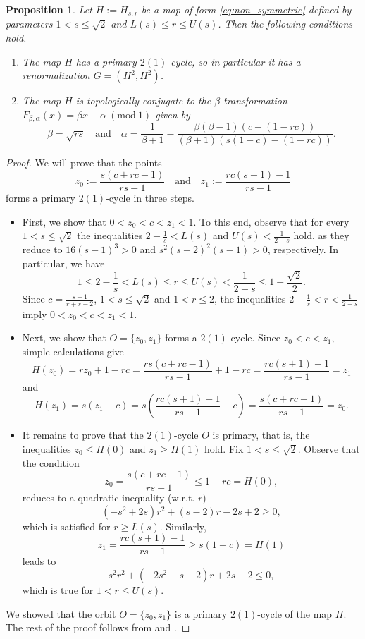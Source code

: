 \documentclass[10pt,reqno]{amsart}
\theoremstyle{plain}
\theoremstyle{assumption}
\theoremstyle{notation}
\theoremstyle{claim}
\theoremstyle{conj}
\theoremstyle{theorem}
\theoremstyle{proposition}
\newtheorem{proposition}{Proposition}[section]
\theoremstyle{corollary}
\newcommand{\Mod}[1]{\ (\mathrm{mod}\ #1)}
\begin{document}
\begin{proposition}
    \label{prop:non_symmetric}
    Let $H:=H_{s,r}$ be a map of form \eqref{eq:non_symmetric} defined by parameters
    $1<s\leq\sqrt{2}$ and $L(s)\leq r\leq U(s)$. Then the following conditions hold.
    \begin{enumerate}
        \item The map $H$ has a primary $2(1)$-cycle, so in particular it has a renormalization $G=(H^2,H^2)$.
        \item The map $H$ is topologically conjugate to the $\beta$-transformation $F_{\beta,\alpha}(x)=\beta x+\alpha\Mod{1}$ given by
        $$
        \beta=\sqrt{rs}\quad\text{and}\quad\alpha=\frac{1}{\beta+1}-\frac{\beta(\beta-1)(c-(1-rc))}{(\beta+1)(s(1-c)-(1-rc))}.
        $$
    \end{enumerate}
\end{proposition}
\begin{proof}
    We will prove that the points
    $$
    z_0:=\frac{s(c+rc-1)}{rs-1}\quad\text{and}\quad z_1:=\frac{rc(s+1)-1}{rs-1}
    $$
    forms a primary $2(1)$-cycle in three steps.
    \begin{itemize}
        \item First, we show that $0<z_0<c<z_1<1$. To this end, observe that for every $1<s\leq\sqrt{2}$ the inequalities
        $
        2-\frac{1}{s}<L(s)
        $
        and
        $
        U(s)<\frac{1}{2-s}
        $
        hold, as they reduce to $16(s-1)^3>0$ and $s^2(s-2)^2(s-1)>0$, respectively. In particular, we have
        $$
        1\leq2-\frac{1}{s}<L(s)\leq r \leq U(s)<\frac{1}{2-s}\leq1+\frac{\sqrt{2}}{2}.
       $$
       Since $c=\frac{s-1}{r+s-2}$, $1<s\leq\sqrt{2}$ and $1<r\leq2$, the inequalities $2-\frac{1}{s}<r<\frac{1}{2-s}$ imply $0<z_0<c<z_1<1$.

       \item Next, we show that $O=\{z_0,z_1\}$ forms a $2(1)$-cycle. Since $z_0<c<z_1$, simple calculations give
       $$
       H(z_0)=rz_0+1-rc=\frac{rs(c+rc-1)}{rs-1}+1-rc=\frac{rc(s+1)-1}{rs-1}=z_1
       $$
       and
       $$
       H(z_1)=s(z_1-c)=s\left(\frac{rc(s+1)-1}{rs-1}-c \right)=\frac{s(c+rc-1)}{rs-1}=z_0.
       $$

       \item It remains to prove that the $2(1)$-cycle $O$ is primary, that is, the inequalities $z_0\leq H(0)$ and $z_1\geq H(1)$ hold. Fix $1<s\leq\sqrt{2}$. Observe that the condition
       $$
       z_0=\frac{s(c+rc-1)}{rs-1}\leq1-rc=H(0),
       $$
       reduces to a quadratic inequality (w.r.t. $r$)
       $$
       (-s^2+2s)r^2+(s-2)r-2s+2\geq0,
       $$
       which is satisfied for $r\geq L(s)$. Similarly,
       $$
       z_1=\frac{rc(s+1)-1}{rs-1}\geq s(1-c)=H(1)
       $$
       leads to
       $$
       s^2r^2+(-2s^2-s+2)r+2s-2\leq0,
       $$
       which is true for $1<r\leq U(s)$.
    \end{itemize}
    We showed that the orbit $O=\{z_0,z_1\}$ is a primary $2(1)$-cycle of the map $H$. The rest of the proof follows from \cite[Theorem~3.5(1)]{ChO} and \cite[Corollary 3]{DiCui}.
    \end{proof}
\end{document}
